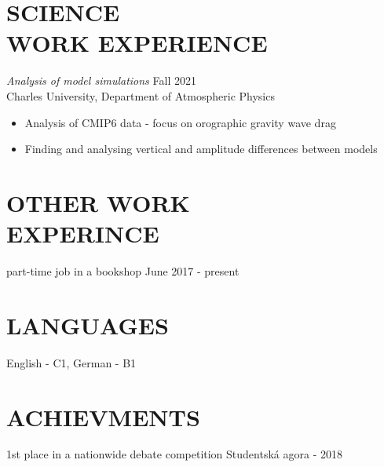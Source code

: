 \documentclass[margin, 10pt]{res} %
\begin{document}
\begin{resume}
\section{SCIENCE\\ WORK EXPERIENCE}

{\sl Analysis of model simulations} \hfill Fall 2021 \\
Charles University, Department of Atmospheric Physics

\begin{itemize} \itemsep -2pt %
\item Analysis of CMIP6 data - focus on orographic gravity wave drag 
\item Finding and analysing vertical and amplitude differences between models
\end{itemize}
 

\section{OTHER WORK\\ EXPERINCE}

part-time job in a bookshop \hfill June 2017 - present \\

\section{LANGUAGES}
English - C1, German - B1

\section{ACHIEVMENTS}
1st place in a nationwide debate competition Studentská agora - 2018 \\



\end{resume}
\end{document}
